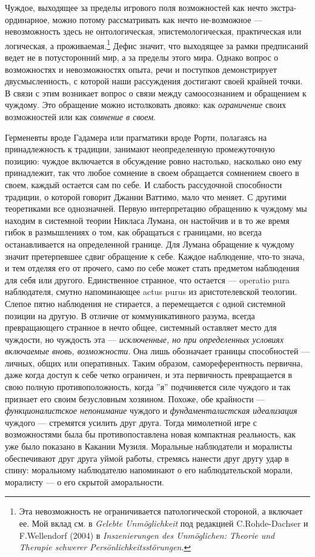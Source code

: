 \documentclass[12pt]{book}
\begin{document}
Чуждое, выходящее за пределы игрового поля возможностей как нечто экстра-ординарное, можно потому рассматривать как нечто не-возможное --- невозможность здесь не онтологическая, эпистемологическая, практическая или логическая, а проживаемая.\footnote{Эта невозможность не ограничивается патологической стороной, а включает ее. Мой вклад см. в \textit{Gelebte Unmöglichkeit} под редакцией C.Rohde-Dachser и F.Wellendorf (2004) в \textit{Inszenierungen des Unmöglichen: Theorie und Therapie schwerer Persönlichkeitsstörungen}.} Дефис значит, что выходящее за рамки предписаний ведет не в потусторонний мир, а за пределы этого мира. Однако вопрос о возможностях и невозможностях опыта, речи и поступков демонстрирует двусмысленность, с которой наши рассуждения достигают своей крайней точки. В связи с этим возникает вопрос о связи между самоосознанием и обращением к чуждому. Это обращение можно истолковать двояко: как \textit{ограничение} своих возможностей или как \textit{сомнение в своем}.

Герменевты вроде Гадамера или прагматики вроде Рорти, полагаясь на принадлежность к традиции, занимают неопределенную промежуточную позицию: чуждое включается в обсуждение ровно настолько, насколько оно ему принадлежит, так что любое сомнение в своем обращается сомнением своего в своем, каждый остается сам по себе. И слабость рассудочной способности традиции, о которой говорит Джанни Ваттимо, мало что меняет. С другими теоретиками все однозначней. Первую интерпретацию обращению к чуждому мы находим в системной теории Никласа Лумана, он настойчив и в то же время гибок в размышлениях о том, как обращаться с границами, но всегда останавливается на определенной границе. Для Лумана обращение к чуждому значит претерпевшее сдвиг обращение к себе. Каждое наблюдение, что-то знача, и тем отделяя его от прочего, само по себе может стать предметом наблюдения для себя или другого. Единственное странное, что остается --- operatio pura наблюдателя, смутно напоминающее actus purus из аристотелевской теологии. Слепое пятно наблюдения не стирается, а перемещается с одной системной позиции на другую. В отличие от коммуникативного разума, всегда превращающего странное в нечто общее, системный оставляет место для чуждости, но чуждость эта --- \textit{исключенные, но при определенных условиях включаемые вновь, возможности}. Она лишь обозначает границы способностей --- личных, общих или оперативных. Таким образом, самореферентность первична, даже когда доступ к себе четко ограничен, и эта первичность превращается в свою полную противоположность, когда ''я'' подчиняется силе чуждого и так признает его своим безусловным хозяином. Похоже, обе крайности --- \textit{функционалистское непонимание} чуждого и \textit{фундаменталистская идеализация} чуждого --- стремятся усилить друг друга. Тогда мимолетной игре с возможностями была бы противопоставлена новая компактная реальность, как уже было показано в Какании Музиля. Моральные наблюдатели и моралисты обеспечивают друг друга уймой работы, стремясь нанести друг другу удар в спину: моральному наблюдателю напоминают о его наблюдательской морали, моралисту --- о его скрытой аморальности.
\end{document}
